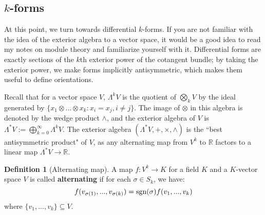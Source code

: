 \documentclass[11pt, oneside]{article}   	%
\theoremstyle{definition}
\newtheorem{definition}{Definition}[section]
\begin{document}
\subsection{$k$-forms}

At this point, we turn towards differential $k$-forms. If you are not familiar with the idea of the exterior algebra to a vector 
space, it would be a good idea to read my notes on module theory and familiarize yourself with it. Differential forms are 
exactly sections of the $k$th exterior power of the cotangent bundle; by taking the exterior power, we make forms 
implicitly antisymmetric, which makes them useful to define orientations. 

Recall that for a vector space $V$, $\Lambda^k V$ is the quotient of $\bigotimes_k V$ by the ideal generated by 
$\{x_1\otimes ...\otimes x_k : x_i = x_j, i\neq j\}$. The image of $\otimes$ in this algebra is denoted by the wedge product 
$\wedge$, and the exterior algebra of $V$ is $\Lambda^* V := \bigoplus_{k = 0}^\infty\Lambda^k V$. The exterior 
algebra $(\Lambda^* V, +, \times, \wedge)$ is the ``best antisymmetric product" of $V$, as any alternating map from 
$V^k$ to $\mathbb R$ factors to a linear map $\Lambda^* V\rightarrow\mathbb R$. 

\begin{definition}[Alternating map]
	A map $f : V^k\rightarrow K$ for a field $K$ and a $K$-vector space $V$ is called \textbf{alternating} if for each $\sigma
	\in S_k$, we have:
	\begin{equation}
		f(v_{\sigma (1)}, ..., v_{\sigma (k)}) = \textnormal{sgn}(\sigma) f(v_1, ..., v_k)
	\end{equation}
	where $\{v_1, ..., v_k\}\subseteq V$. 
\end{definition}
\end{document}
